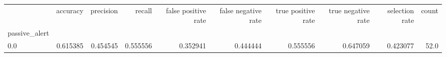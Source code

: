 \begin{tabular}{lrrrrrrrrr}
\toprule
{} &  accuracy &  precision &    recall &  false positive rate &  false negative rate &  true positive rate &  true negative rate &  selection rate &  count \\
passive\_alert &           &            &           &                      &                      &                     &                     &                 &        \\
\midrule
0.0           &  0.615385 &   0.454545 &  0.555556 &             0.352941 &             0.444444 &            0.555556 &            0.647059 &        0.423077 &   52.0 \\
\bottomrule
\end{tabular}

